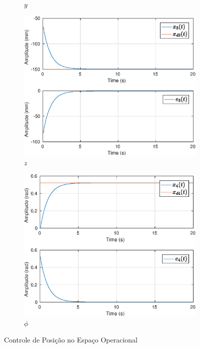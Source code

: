 \begin{figure}[H]
\begin{subfigure}{.5\textwidth}
  \caption{$y$}
  \label{fig:sub2}
\end{subfigure}
\begin{subfigure}{.5\textwidth}
  \centering
  \includegraphics[width=\linewidth]{./img/position1/x3.eps}
  \caption{$z$}
  \label{fig:sub1}
\end{subfigure}%
\begin{subfigure}{.5\textwidth}
  \centering
  \includegraphics[width=\linewidth]{./img/position1/x4.eps}
  \caption{$\phi$}
  \label{fig:sub2}
\end{subfigure}
\caption{Controle de Posição no Espaço Operacional}
\label{fig:test}
\end{figure}

